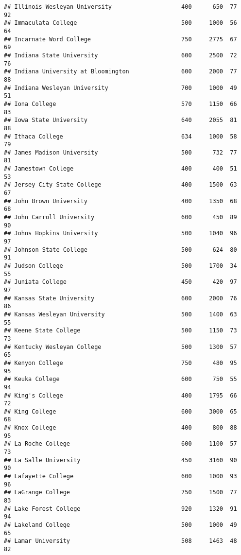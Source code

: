 \documentclass[
]{article}
\begin{document}
\begin{verbatim}
## Illinois Wesleyan University                    400      650  77       92
## Immaculata College                              500     1000  56       64
## Incarnate Word College                          750     2775  67       69
## Indiana State University                        600     2500  72       76
## Indiana University at Bloomington               600     2000  77       88
## Indiana Wesleyan University                     700     1000  49       51
## Iona College                                    570     1150  66       83
## Iowa State University                           640     2055  81       88
## Ithaca College                                  634     1000  58       79
## James Madison University                        500      732  77       81
## Jamestown College                               400      400  51       53
## Jersey City State College                       400     1500  63       67
## John Brown University                           400     1350  68       68
## John Carroll University                         600      450  89       90
## Johns Hopkins University                        500     1040  96       97
## Johnson State College                           500      624  80       91
## Judson College                                  500     1700  34       55
## Juniata College                                 450      420  97       97
## Kansas State University                         600     2000  76       86
## Kansas Wesleyan University                      500     1400  63       55
## Keene State College                             500     1150  73       73
## Kentucky Wesleyan College                       500     1300  57       65
## Kenyon College                                  750      480  95       95
## Keuka College                                   600      750  55       94
## King's College                                  400     1795  66       72
## King College                                    600     3000  65       68
## Knox College                                    400      800  88       95
## La Roche College                                600     1100  57       73
## La Salle University                             450     3160  90       90
## Lafayette College                               600     1000  93       96
## LaGrange College                                750     1500  77       83
## Lake Forest College                             920     1320  91       94
## Lakeland College                                500     1000  49       65
## Lamar University                                508     1463  48       82

\end{verbatim}
\end{document}
